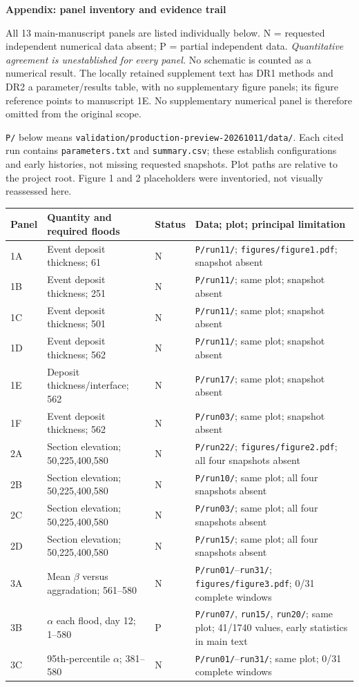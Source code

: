 \documentclass[10pt,letterpaper]{article}
\newcommand{\file}[1]{\nolinkurl{#1}}
\begin{document}
\clearpage
{\large\bfseries Appendix: panel inventory and evidence trail}\par
\small
All 13 main-manuscript panels are listed individually below. N = requested independent numerical data absent; P = partial independent data. \emph{Quantitative agreement is unestablished for every panel.} No schematic is counted as a numerical result. The locally retained supplement text has DR1 methods and DR2 a parameter/results table, with no supplementary figure panels; its figure reference points to manuscript 1E. No supplementary numerical panel is therefore omitted from the original scope.

\texttt{P/} below means \file{validation/production-preview-20261011/data/}. Each cited run contains \file{parameters.txt} and \file{summary.csv}; these establish configurations and early histories, not missing requested snapshots. Plot paths are relative to the project root. Figure 1 and 2 placeholders were inventoried, not visually reassessed here.

\begin{tabularx}{\linewidth}{l>{\raggedright\arraybackslash}p{2.0in}lX}\toprule
Panel & Quantity and required floods & Status & Data; plot; principal limitation\\\midrule
1A & Event deposit thickness; 61 & N & \texttt{P/run11/}; \texttt{figures/figure1.pdf}; snapshot absent\\
1B & Event deposit thickness; 251 & N & \texttt{P/run11/}; same plot; snapshot absent\\
1C & Event deposit thickness; 501 & N & \texttt{P/run11/}; same plot; snapshot absent\\
1D & Event deposit thickness; 562 & N & \texttt{P/run11/}; same plot; snapshot absent\\
1E & Deposit thickness/interface; 562 & N & \texttt{P/run17/}; same plot; snapshot absent\\
1F & Event deposit thickness; 562 & N & \texttt{P/run03/}; same plot; snapshot absent\\
2A & Section elevation; 50,225,400,580 & N & \texttt{P/run22/}; \texttt{figures/figure2.pdf}; all four snapshots absent\\
2B & Section elevation; 50,225,400,580 & N & \texttt{P/run10/}; same plot; all four snapshots absent\\
2C & Section elevation; 50,225,400,580 & N & \texttt{P/run03/}; same plot; all four snapshots absent\\
2D & Section elevation; 50,225,400,580 & N & \texttt{P/run15/}; same plot; all four snapshots absent\\
3A & Mean $\beta$ versus aggradation; 561--580 & N & \texttt{P/run01/}--\texttt{run31/}; \texttt{figures/figure3.pdf}; 0/31 complete windows\\
3B & $\alpha$ each flood, day 12; 1--580 & P & \texttt{P/run07/}, \texttt{run15/}, \texttt{run20/}; same plot; 41/1740 values, early statistics in main text\\
3C & 95th-percentile $\alpha$; 381--580 & N & \texttt{P/run01/}--\texttt{run31/}; same plot; 0/31 complete windows\\\bottomrule
\end{tabularx}
\end{document}

